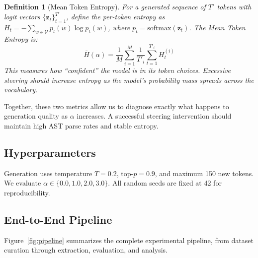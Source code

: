 \documentclass[journal, onecolumn]{IEEEtran}
\newtheorem{definition}{Definition}
\begin{document}
\begin{definition}[Mean Token Entropy]
\label{def:entropy}
For a generated sequence of $T'$ tokens with logit vectors $\{\bm{z}_t\}_{t=1}^{T'}$, define the per-token entropy as $H_t = -\sum_{w \in \mathcal{V}} p_t(w) \log p_t(w)$, where $p_t = \text{softmax}(\bm{z}_t)$. The Mean Token Entropy is:
\begin{equation}
    \bar{H}(\alpha) = \frac{1}{M} \sum_{i=1}^{M} \frac{1}{T'_i} \sum_{t=1}^{T'_i} H_t^{(i)}
    \label{eq:entropy}
\end{equation}
This measures how ``confident'' the model is in its token choices. Excessive steering should increase entropy as the model's probability mass spreads across the vocabulary.
\end{definition}

Together, these two metrics allow us to diagnose exactly what happens to generation quality as $\alpha$ increases. A successful steering intervention should maintain high AST parse rates and stable entropy.

\subsection{Hyperparameters}
Generation uses temperature $T = 0.2$, top-$p = 0.9$, and maximum 150 new tokens. We evaluate $\alpha \in \{0.0, 1.0, 2.0, 3.0\}$. All random seeds are fixed at 42 for reproducibility.

\subsection{End-to-End Pipeline}

Figure~\ref{fig:pipeline} summarizes the complete experimental pipeline, from dataset curation through extraction, evaluation, and analysis.
\end{document}
